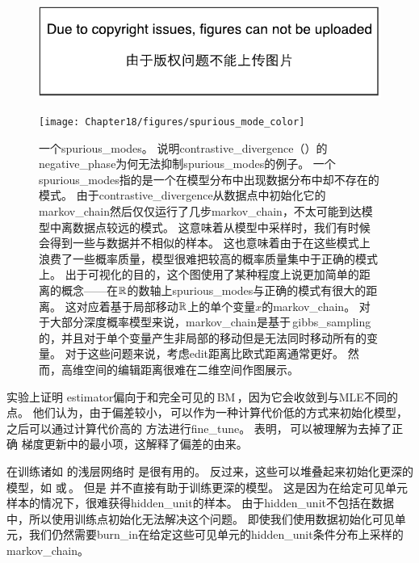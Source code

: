 \begin{figure}[!htb]
\ifOpenSource
\centerline{\includegraphics{figure.pdf}}
\else
\centerline{\texttt{[image: Chapter18/figures/spurious\_mode\_color]}}
\fi
\caption{一个\gls{spurious_modes}。
说明\gls{contrastive_divergence}（）的\gls{negative_phase}为何无法抑制\gls{spurious_modes}的例子。
一个\gls{spurious_modes}指的是一个在模型分布中出现数据分布中却不存在的模式。
由于\gls{contrastive_divergence}从数据点中初始化它的\gls{markov_chain}然后仅仅运行了几步\gls{markov_chain}，不太可能到达模型中离数据点较远的模式。
这意味着从模型中采样时，我们有时候会得到一些与数据并不相似的样本。
这也意味着由于在这些模式上浪费了一些概率质量，模型很难把较高的概率质量集中于正确的模式上。
出于可视化的目的，这个图使用了某种程度上说更加简单的距离的概念——在$\mathbb{R}$的数轴上\gls{spurious_modes}与正确的模式有很大的距离。
这对应着基于局部移动$\mathbb{R}$上的单个变量$x$的\gls{markov_chain}。
对于大部分深度概率模型来说，\gls{markov_chain}是基于\,\gls{gibbs_sampling}的，并且对于单个变量产生非局部的移动但是无法同时移动所有的变量。
对于这些问题来说，考虑edit距离比欧式距离通常更好。
然而，高维空间的编辑距离很难在二维空间作图展示。}
\label{fig:chap18_spurious_mode}
\end{figure}


\cite{Perpinan+Hinton-2005-small}实验上证明\,\,\gls{estimator}偏向于和完全可见的\,\gls{BM}\,，因为它会收敛到与\gls{MLE}不同的点。
他们认为，由于偏差较小，\,可以作为一种计算代价低的方式来初始化模型，之后可以通过计算代价高的\,\,方法进行\gls{fine_tune}。
\cite{Bengio+Delalleau-2009}表明，\,可以被理解为去掉了正确\,\,梯度更新中的最小项，这解释了偏差的由来。


在训练诸如\,\,的浅层网络时\,\,是很有用的。
反过来，这些可以堆叠起来初始化更深的模型，如\,\,或\,。
但是\,\,并不直接有助于训练更深的模型。
这是因为在给定可见单元样本的情况下，很难获得\gls{hidden_unit}的样本。
由于\gls{hidden_unit}不包括在数据中，所以使用训练点初始化无法解决这个问题。
即使我们使用数据初始化可见单元，我们仍然需要\gls{burn_in}在给定这些可见单元的\gls{hidden_unit}条件分布上采样的\gls{markov_chain}。

